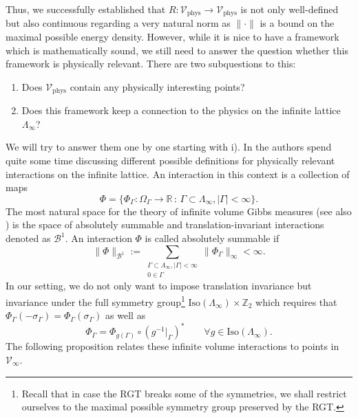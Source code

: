 \documentclass{article}
\newcommand{\Iso}{\mathrm{Iso}}
\newcommand{\phys}{\mathrm{phys}}
\begin{document}
Thus, we successfully established that $R:\mathcal{V}_\phys\to \mathcal{V}_\phys$ is not only well-defined but also continuous regarding a very natural norm as $\|\cdot\|$ is a bound on the maximal possible energy density. However, while it is nice to have a framework which is mathematically sound, we still need to answer the question whether this framework is physically relevant. There are two subquestions to this:
\begin{enumerate}
    \item[i)] Does $\mathcal{V}_\phys$ contain any physically interesting points?
    \item[ii)] Does this framework keep a connection to the physics on the infinite lattice $\Lambda_\infty$? 
\end{enumerate}
We will try to answer them one by one starting with i). In \cite{van_Enter_1993} the authors spend quite some time discussing different possible definitions for physically relevant interactions on the infinite lattice. An interaction in this context is a collection of maps
\begin{equation}
    \Phi=\{\Phi_\Gamma:\Omega_\Gamma\to\mathds{R}\,:\,\Gamma\subset\Lambda_\infty,|\Gamma|<\infty\}.
\end{equation}
The most natural space for the theory of infinite volume Gibbs measures (see also \cite{friedli_velenik_2017}) is the space of absolutely summable and translation-invariant interactions denoted as $\mathcal{B}^1$. An interaction $\Phi$ is called absolutely summable if
\begin{equation}
    \|\Phi\|_{\mathcal{B}^1}:=\sum_{\substack{\Gamma\subset\Lambda_\infty,|\Gamma|<\infty\\0\in\Gamma}}\|\Phi_\Gamma\|_\infty<\infty.
\end{equation}
In our setting, we do not only want to impose translation invariance but invariance under the full symmetry group\footnote{Recall that in case the RGT breaks some of the symmetries, we shall restrict ourselves to the maximal possible symmetry group preserved by the RGT.} $\Iso(\Lambda_\infty)\times\mathds{Z}_2$ which requires that $\Phi_\Gamma(-\sigma_\Gamma)=\Phi_\Gamma(\sigma_\Gamma)$ as well as 
\begin{equation}
    \Phi_\Gamma=\Phi_{g(\Gamma)}\circ(g^{-1}|_\Gamma)^*\qquad\forall g\in\Iso(\Lambda_\infty).
\end{equation}
The following proposition relates these infinite volume interactions to points in $\mathcal{V}_\infty$.
\end{document}
